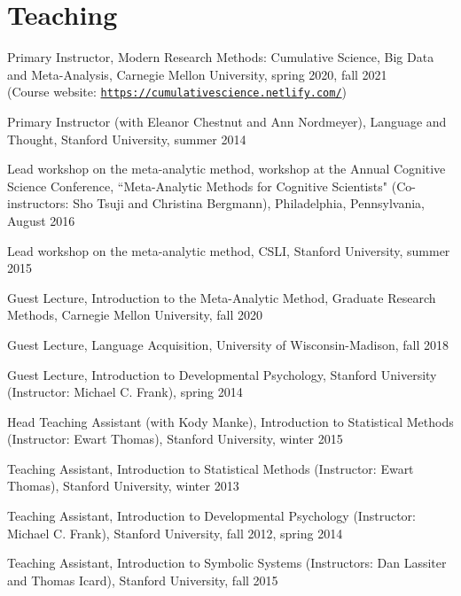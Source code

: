 \documentclass[letterpaper]{article}
\renewenvironment{itemize}{
  \begin{list}{}{
    \setlength{\leftmargin}{1.5em}
  }
}{
  \end{list}
}
\begin{document}


\section*{Teaching}
\begin{itemize}
\item Primary Instructor, Modern Research Methods: Cumulative Science, Big Data and Meta-Analysis, Carnegie Mellon University, spring 2020, fall 2021 \\(Course website: \href{https://cumulativescience.netlify.com/}{\tt https://cumulativescience.netlify.com/})
\item  Primary Instructor (with Eleanor Chestnut and Ann Nordmeyer), Language and Thought, Stanford University, summer 2014
\item Lead workshop on the meta-analytic method, workshop at the Annual Cognitive Science Conference, ``Meta-Analytic Methods for Cognitive Scientists" (Co-instructors: Sho Tsuji and Christina Bergmann), Philadelphia, Pennsylvania, August 2016
\item  Lead workshop on the meta-analytic method, CSLI, Stanford University, summer 2015
\item  Guest Lecture, Introduction to the Meta-Analytic Method, Graduate Research Methods, Carnegie Mellon University, fall 2020

\item  Guest Lecture, Language Acquisition, University of Wisconsin-Madison, fall 2018
\item Guest Lecture, Introduction to Developmental Psychology, Stanford University (Instructor: Michael C. Frank), spring 2014
\item Head Teaching Assistant (with Kody Manke), Introduction to Statistical Methods (Instructor: Ewart Thomas), Stanford University, winter 2015

\item  Teaching Assistant,  Introduction to Statistical Methods (Instructor: Ewart Thomas), Stanford University, winter 2013
\item Teaching Assistant, Introduction to Developmental Psychology (Instructor: Michael C. Frank), Stanford University, fall 2012, spring 2014
\item Teaching Assistant, Introduction to Symbolic Systems (Instructors: Dan Lassiter and Thomas Icard), Stanford University, fall 2015


\end{itemize}
\end{document}
